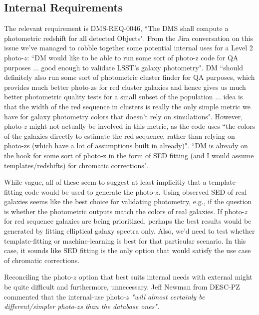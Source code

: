 \documentclass[DM,lsstdraft,toc]{lsstdoc}
\begin{document}
\subsection{Internal Requirements}\label{ssec:motivation_internal}

The relevant requirement is DMS-REQ-0046, ``The DMS shall compute a photometric redshift for all detected Objects". From the Jira conversation on this issue we've managed to cobble together some potential internal uses for a Level 2 photo-$z$: 
 ``DM would like to be able to run some sort of photo-z code for QA purposes ... good enough to validate LSST's galaxy photometry".
 DM ``should definitely also run some sort of photometric cluster finder for QA purposes, which provides much better photo-zs for red cluster galaxies and hence gives us much better photometric quality tests for a small subset of the population ... idea is that the width of the red sequence in clusters is really the only simple metric we have for galaxy photometry colors that doesn't rely on simulations". However, photo-$z$ might not actually be involved in this metric, as the code uses ``the colors of the galaxies directly to estimate the red sequence, rather than relying on photo-zs (which have a lot of assumptions built in already)".
 ``DM is already on the hook for some sort of photo-z in the form of SED fitting (and I would assume templates/redshifts) for chromatic corrections".

While vague, all of these seem to suggest at least implicitly that a template-fitting code would be used to generate the photo-$z$. 
 Using observed SED of real galaxies seems like the best choice for validating photometry, e.g., if the question is whether the photometric outputs match the colors of real galaxies. 
 If photo-$z$ for red sequence galaxies are being prioritized, perhaps the best results would be generated by fitting elliptical galaxy spectra only. Also, we'd need to test whether template-fitting or machine-learning is best for that particular scenario. 
 In this case, it sounds like SED fitting is the only option that would satisfy the use case of chromatic corrections.

Reconciling the photo-$z$ option that best suits internal needs with external might be quite difficult and furthermore, unnecessary. Jeff Newman from DESC-PZ commented that the internal-use photo-$z$ {\it "will almost certainly be different/simpler photo-$z$s than the database ones".}
\end{document}
